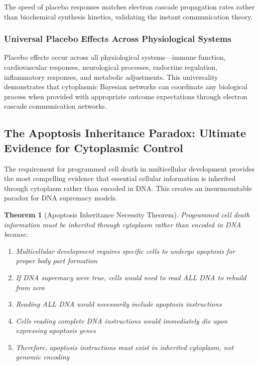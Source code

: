 \documentclass[12pt,a4paper]{article}
\newtheorem{theorem}{Theorem}
\begin{document}
The speed of placebo responses matches electron cascade propagation rates rather than biochemical synthesis kinetics, validating the instant communication theory.

\subsubsection{Universal Placebo Effects Across Physiological Systems}

Placebo effects occur across all physiological systems—immune function, cardiovascular responses, neurological processes, endocrine regulation, inflammatory responses, and metabolic adjustments. This universality demonstrates that cytoplasmic Bayesian networks can coordinate any biological process when provided with appropriate outcome expectations through electron cascade communication networks.

\subsection{The Apoptosis Inheritance Paradox: Ultimate Evidence for Cytoplasmic Control}

The requirement for programmed cell death in multicellular development provides the most compelling evidence that essential cellular information is inherited through cytoplasm rather than encoded in DNA. This creates an insurmountable paradox for DNA supremacy models.

\begin{theorem}[Apoptosis Inheritance Necessity Theorem]
Programmed cell death information must be inherited through cytoplasm rather than encoded in DNA because:
\begin{enumerate}
\item Multicellular development requires specific cells to undergo apoptosis for proper body part formation
\item If DNA supremacy were true, cells would need to read ALL DNA to rebuild from zero
\item Reading ALL DNA would necessarily include apoptosis instructions
\item Cells reading complete DNA instructions would immediately die upon expressing apoptosis genes
\item Therefore, apoptosis instructions must exist in inherited cytoplasm, not genomic encoding
\end{enumerate}
\end{theorem}
\end{document}
